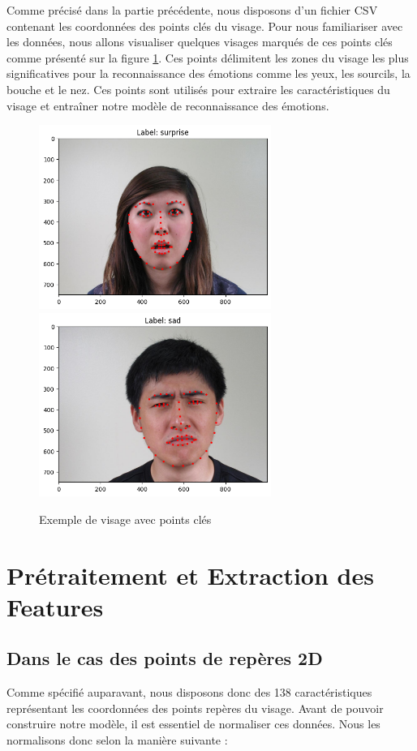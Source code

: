 \documentclass{rapport}
\begin{document}
Comme précisé dans la partie précédente, nous disposons d'un fichier CSV contenant les coordonnées des points clés du visage. Pour nous familiariser
avec les données, nous allons visualiser quelques visages marqués de ces points clés comme présenté sur la figure
\ref*{fig:face_landmarks}. Ces points délimitent les zones du visage les plus significatives pour la reconnaissance des émotions
comme les yeux, les sourcils, la bouche et le nez. Ces points sont utilisés pour extraire les caractéristiques du visage et entraîner
notre modèle de reconnaissance des émotions.
\begin{figure}
    \centering
    \includegraphics[height=6cm]{IMAGES/exemple1_landmark_jeu_donnee.png}
    \includegraphics[height=6cm]{IMAGES/exemple2_landmark_jeu_donnee.png}
    \caption{Exemple de visage avec points clés}
    \label{fig:face_landmarks}
\end{figure}

\section{Prétraitement et Extraction des Features}
\subsection{Dans le cas des points de repères 2D}
Comme spécifié auparavant, nous disposons donc des 138 caractéristiques représentant les coordonnées des points repères du visage.
Avant de pouvoir construire notre modèle, il est essentiel de normaliser ces données.
Nous les normalisons donc selon la manière suivante \cite{kalapalaFacialExpressionRecognition2020} :\\
\end{document}
